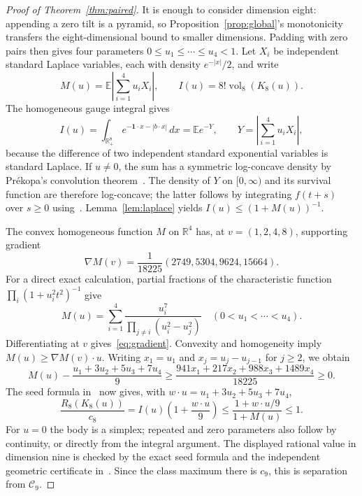\documentclass[11pt,a4paper]{article}
\newcommand{\vol}{\operatorname{vol}}
\newcommand{\E}{\mathbb E}
\newcommand{\CC}{\mathcal C}
\begin{document}
\begin{proof}[Proof of Theorem~\ref{thm:paired}]
It is enough to consider dimension eight: appending a zero tilt is a
pyramid, so Proposition~\ref{prop:global}'s monotonicity transfers the
eight-dimensional bound to smaller dimensions. Padding with zero pairs
then gives four parameters $0\le u_1\le\cdots\le u_4<1$.
Let $X_i$ be independent standard Laplace variables, each with density
$e^{-|x|}/2$, and write
\[
 M(u)=\E\left|\sum_{i=1}^4u_iX_i\right|,\qquad
 I(u)=8!\vol_8(K_8(u)).
\]
The homogeneous gauge integral gives
\[
 I(u)=\int_{\mathbb R_+^8}e^{-\boldsymbol1\cdot x-|b\cdot x|}\,dx
     =\E e^{-Y},\qquad Y=\left|\sum_{i=1}^4u_iX_i\right|,
\]
because the difference of two independent standard exponential
variables is standard Laplace. If $u\ne0$, the sum has a symmetric
log-concave density by Pr\'ekopa's convolution theorem~\cite[Theorem 7]{prekopa}.
The density of $Y$ on $[0,\infty)$ and its survival function are therefore
log-concave; the latter follows by integrating $f(t+s)$ over $s\ge0$
using~\cite[Theorem 6]{prekopa}. Lemma~\ref{lem:laplace} yields
$I(u)\le(1+M(u))^{-1}$.

The convex homogeneous function $M$ on $\mathbb R^4$ has, at $v=(1,2,4,8)$,
supporting gradient
\begin{equation}\label{eq:gradient}
 \nabla M(v)=\frac1{18225}(2749,5304,9624,15664).
\end{equation}
For a direct exact calculation, partial fractions of the characteristic
function $\prod_i(1+u_i^2t^2)^{-1}$ give
\[
 M(u)=\sum_{i=1}^4\frac{u_i^7}{\prod_{j\ne i}(u_i^2-u_j^2)}
 \quad(0<u_1<\cdots<u_4).
\]
Differentiating at $v$ gives~\eqref{eq:gradient}. Convexity and homogeneity
imply $M(u)\ge\nabla M(v)\cdot u$.
Writing $x_1=u_1$ and $x_j=u_j-u_{j-1}$ for $j\ge2$, we obtain
\begin{equation}\label{eq:gap}
 M(u)-\frac{u_1+3u_2+5u_3+7u_4}{9}
 \ge\frac{941x_1+217x_2+988x_3+1489x_4}{18225}\ge0.
\end{equation}
The seed formula in~\cite[Proposition 2]{paper} now gives, with
$w\cdot u=u_1+3u_2+5u_3+7u_4$,
\[
 \frac{R_8(K_8(u))}{c_8}
 =I(u)\left(1+\frac{w\cdot u}{9}\right)
 \le\frac{1+w\cdot u/9}{1+M(u)}\le1.
\]
For $u=0$ the body is a simplex; repeated and zero parameters also follow
by continuity, or directly from the integral argument. The displayed
rational value in dimension nine is checked by the exact seed formula
and the independent geometric certificate in~\cite{paper}. Since the
class maximum there is $c_9$, this is separation from $\CC_9$.
\end{proof}
\end{document}
